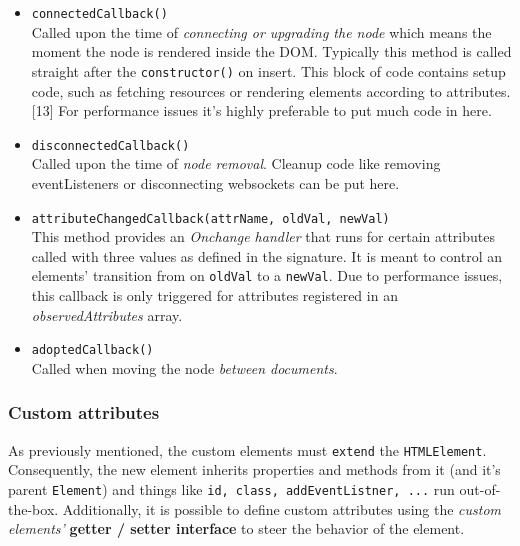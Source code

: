 \documentclass[]{assets/latex/ieee}
\providecommand{\tightlist}{%
  \setlength{\itemsep}{0pt}\setlength{\parskip}{0pt}}
\begin{document}
\begin{itemize}
\tightlist
\item
  \texttt{connectedCallback()}\\
  Called upon the time of \emph{connecting or upgrading the node} which
  means the moment the node is rendered inside the DOM. Typically this
  method is called straight after the \texttt{constructor()} on insert.
  This block of code contains setup code, such as fetching resources or
  rendering elements according to attributes.{[}13{]} For performance
  issues it's highly preferable to put much code in here.
\item
  \texttt{disconnectedCallback()}\\
  Called upon the time of \emph{node removal}. Cleanup code like
  removing eventListeners or disconnecting websockets can be put here.
\item
  \texttt{attributeChangedCallback(attrName,\ oldVal,\ newVal)}\\
  This method provides an \emph{Onchange handler} that runs for certain
  attributes called with three values as defined in the signature. It is
  meant to control an elements' transition from on \texttt{oldVal} to a
  \texttt{newVal}. Due to performance issues, this callback is only
  triggered for attributes registered in an \emph{observedAttributes}
  array.
\item
  \texttt{adoptedCallback()}\\
  Called when moving the node \emph{between documents}.
\end{itemize}

\subsubsection{Custom attributes}\label{custom-attributes}

As previously mentioned, the custom elements must \texttt{extend} the
\texttt{HTMLElement}. Consequently, the new element inherits properties
and methods from it (and it's parent \texttt{Element}) and things like
\texttt{id,\ class,\ addEventListner,\ ...} run out-of-the-box.
Additionally, it is possible to define custom attributes using the
\emph{custom elements'} \textbf{getter / setter interface} to steer the
behavior of the element.
\end{document}
